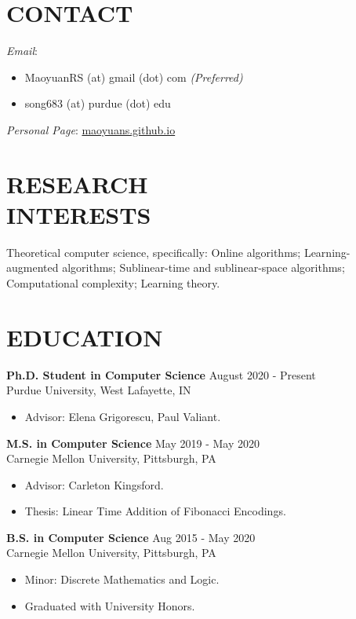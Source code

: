 \documentclass[margin, 10pt]{res} %
\begin{document}
\begin{resume}

\section{CONTACT}
\emph{Email}:

\begin{itemize}
\item MaoyuanRS (at) gmail (dot) com \emph{(Preferred)}
\item song683 (at) purdue (dot) edu
\end{itemize}
\emph{Personal Page}: \href{https://maoyuans.github.io}{maoyuans.github.io}

 
\section{RESEARCH \\ INTERESTS}  

Theoretical computer science, specifically: Online algorithms; Learning-augmented algorithms; Sublinear-time and sublinear-space algorithms; Computational complexity; Learning theory.

 
\section{EDUCATION}

{\bf Ph.D. Student in Computer Science} \hfill August 2020 - Present \\
Purdue University, West Lafayette, IN

\begin{itemize}
\item Advisor: Elena Grigorescu, Paul Valiant.
\end{itemize} 

{\bf M.S. in Computer Science} \hfill May 2019 - May 2020 \\
Carnegie Mellon University, Pittsburgh, PA

\begin{itemize}
\item Advisor: Carleton Kingsford.
\item Thesis: Linear Time Addition of Fibonacci Encodings.
\end{itemize} 

{\bf B.S. in Computer Science} \hfill Aug 2015 - May 2020 \\
Carnegie Mellon University, Pittsburgh, PA

\begin{itemize}
\item Minor: Discrete Mathematics and Logic.
\item Graduated with University Honors.
\end{itemize} 



\end{resume}
\end{document}
